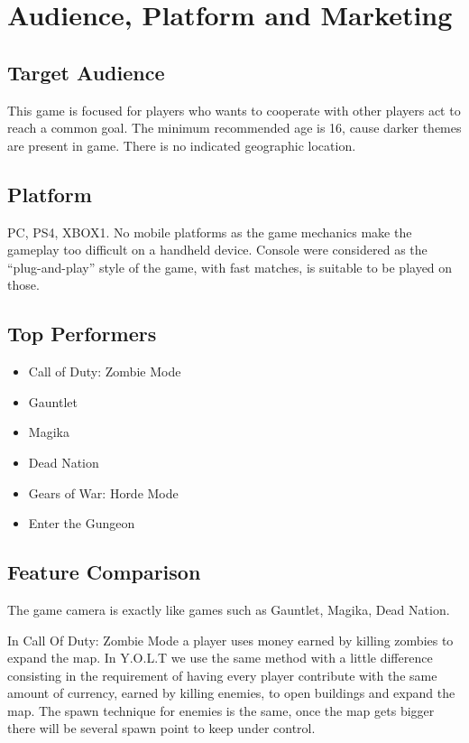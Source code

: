\documentclass[12pt]{article}
\begin{document}
\newpage

\section{Audience, Platform and Marketing}

\subsection{Target Audience}

This game is focused for players who wants to cooperate with other players act to reach a common goal. The minimum recommended age is 16, cause darker themes are present in game. There is no indicated geographic location.

\subsection{Platform}

PC, PS4, XBOX1. No mobile platforms as the game mechanics make the gameplay too difficult on a handheld device. Console were considered as the “plug-and-play” style of the game, with fast matches, is suitable to be played on those.

\subsection{Top Performers}

\begin{itemize}
	\item Call of Duty: Zombie Mode
	\item Gauntlet
	\item Magika
	\item Dead Nation
	\item Gears of War: Horde Mode
	\item Enter the Gungeon
\end{itemize}

\subsection{Feature Comparison}

The game camera is exactly like games such as Gauntlet, Magika, Dead Nation.

In Call Of Duty: Zombie Mode a player uses money earned by killing zombies to expand the map. In Y.O.L.T we use the same method with a little difference consisting in the requirement of having every player contribute with the same amount of currency, earned by killing enemies, to open buildings and expand the map. The spawn technique for enemies is the same, once the map gets bigger there will be several spawn point to keep under control.
\end{document}
